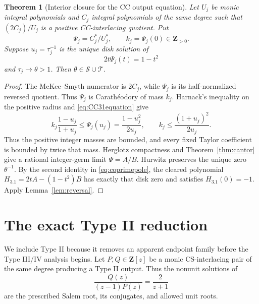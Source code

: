 \documentclass[11pt,reqno]{amsart}
\newtheorem{theorem}{Theorem}[section]
\theoremstyle{definition}
\theoremstyle{remark}
\newcommand{\Z}{\mathbf Z}
\newcommand{\calS}{\mathcal S}
\newcommand{\calT}{\mathcal T}
\begin{document}
\begin{theorem}[Interior closure for the CC output equation]\label{thm:CC31}
Let $U_j$ be monic integral polynomials and $C_j$ integral polynomials of the
same degree such that $(2C_j)/U_j$ is a positive CC-interlacing quotient.  Put
\[
 \Psi_j=C_j^*/U_j^*,\qquad k_j=\Psi_j(0)\in\Z_{>0}.
\]
Suppose $u_j=\tau_j^{-1}$ is the unique disk solution of
\begin{equation}\label{eq:CC31equation}
 2t\Psi_j(t)=1-t^2
\end{equation}
and $\tau_j\to\theta>1$.  Then $\theta\in\calS\cup\calT$.
\end{theorem}

\begin{proof}
The McKee--Smyth numerator is $2C_j$, while $\Psi_j$ is its half-normalized
reversed quotient.  Thus $\Psi_j$ is Carath\'eodory of mass $k_j$.
Harnack's inequality
on the positive radius and \eqref{eq:CC31equation} give
\[
 k_j\frac{1-u_j}{1+u_j}\le\Psi_j(u_j)
 =\frac{1-u_j^2}{2u_j},
 \qquad
 k_j\le\frac{(1+u_j)^2}{2u_j}.
\]
Thus the positive integer masses are bounded, and every fixed Taylor
coefficient is bounded by twice that mass.  Herglotz compactness and
Theorem~\ref{thm:cantor} give a rational integer-germ limit
$\Psi=A/B$.  Hurwitz preserves the unique zero $\theta^{-1}$.  By the second
identity in \eqref{eq:coprimepole}, the cleared polynomial
$H_{3.1}=2tA-(1-t^2)B$ has exactly that disk zero and satisfies
$H_{3.1}(0)=-1$.  Apply Lemma~\ref{lem:reversal}.
\end{proof}

\section{The exact Type II reduction}

We include Type II because it removes an apparent endpoint family before the
Type III/IV analysis begins.  Let $P,Q\in\Z[z]$ be a monic CS-interlacing pair
of the same degree producing a Type II output.  Thus the nonunit solutions of
\begin{equation}\label{eq:typeIIeq}
 \frac{Q(z)}{(z-1)P(z)}=\frac2{z+1}
\end{equation}
are the prescribed Salem root, its conjugates, and allowed unit roots.
\end{document}
